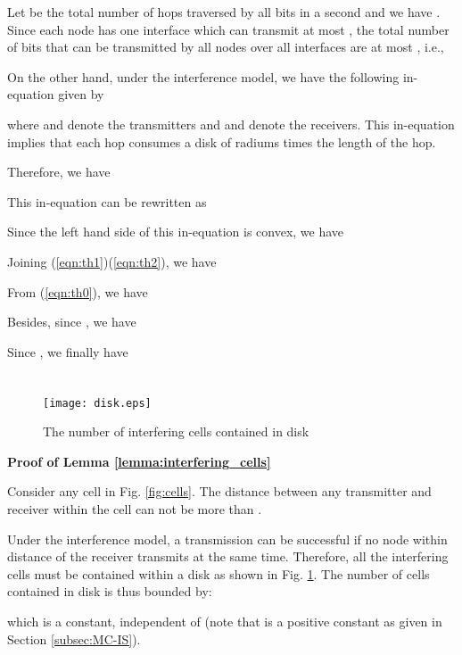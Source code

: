 \documentclass[10pt,journal]{IEEEtran}
\def\done{\hspace*{\fill} }
\begin{document}
Let  be the total number of hops traversed by all bits in a second and we have . Since each node has one interface which can transmit at most , the total number of bits that can be transmitted by all nodes over all interfaces are at most , i.e.,


On the other hand, under the interference model, we have the following in-equation given by \cite{Gupta:Kumar}

where  and  denote the transmitters and  and  denote the receivers. This in-equation implies that each hop consumes a disk of radiums  times the length of the hop.

Therefore, we have 


This in-equation can be rewritten as


Since the left hand side of this in-equation is convex, we have


Joining (\ref{eqn:th1})(\ref{eqn:th2}), we have


From (\ref{eqn:th0}), we have


Besides, since , we have


Since , we finally have

\done

\section{}

\begin{figure}[t]
\centering
 \texttt{[image: disk.eps]}
\caption{The number of interfering cells contained in disk }
\label{fig:disk}
\end{figure}

\textbf{Proof of Lemma \ref{lemma:interfering_cells}}

Consider any cell in Fig. \ref{fig:cells}. The distance between any 
transmitter and receiver within the cell can not be more than
.

Under the interference model, a transmission can be successful if no node within distance  of the receiver transmits at the same time. Therefore, all the interfering cells must be contained within a disk  as shown in Fig. \ref{fig:disk}. The number of cells contained in disk  is thus bounded by:

which is a constant, independent of  (note that  is a positive constant as given in Section \ref{subsec:MC-IS}).\done

\section{}
\end{document}
